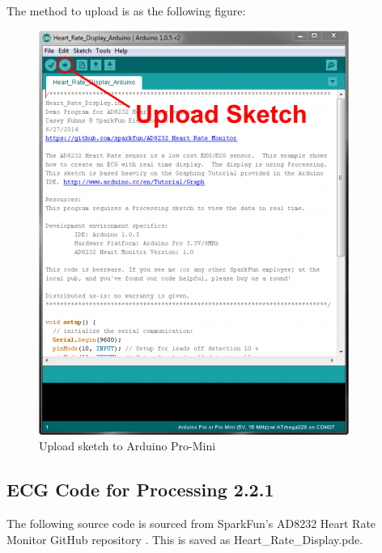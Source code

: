 The method to upload is as the following figure: 

\begin{figure}[H]
	\centering
	\includegraphics[width=0.4\linewidth]{ecgarduino.png}
	\caption{Upload sketch to Arduino Pro-Mini \cite{ad8232}}
\end{figure}

\subsection{ECG Code for Processing 2.2.1}
\label{ecgprocessing}

The following source code is sourced from SparkFun's AD8232 Heart Rate Monitor GitHub repository \cite{ad8232github}. This is saved as Heart\_Rate\_Display.pde.


